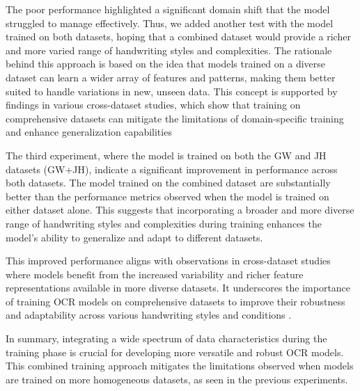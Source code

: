 The poor performance highlighted a significant domain shift that the model struggled to manage effectively. Thus, we added another test with the model trained on both datasets, hoping that a combined dataset would provide a richer and more varied range of handwriting styles and complexities. The rationale behind this approach is based on the idea that models trained on a diverse dataset can learn a wider array of features and patterns, making them better suited to handle variations in new, unseen data. This concept is supported by findings in various cross-dataset studies, which show that training on comprehensive datasets can mitigate the limitations of domain-specific training and enhance generalization capabilities

The third experiment, where the model is trained on both the GW and JH datasets (GW+JH), indicate a significant improvement in performance across both datasets. The model trained on the combined dataset are substantially better than the performance metrics observed when the model is trained on either dataset alone. This suggests that incorporating a broader and more diverse range of handwriting styles and complexities during training enhances the model's ability to generalize and adapt to different datasets.

This improved performance aligns with observations in cross-dataset studies where models benefit from the increased variability and richer feature representations available in more diverse datasets. It underscores the importance of training OCR models on comprehensive datasets to improve their robustness and adaptability across various handwriting styles and conditions \citep{laroca2022}.

In summary, integrating a wide spectrum of data characteristics during the training phase is crucial for developing more versatile and robust OCR models. This combined training approach mitigates the limitations observed when models are trained on more homogeneous datasets, as seen in the previous experiments.


